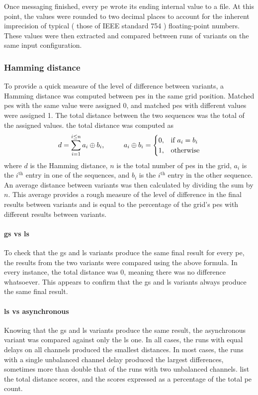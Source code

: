 Once messaging finished, every \gls{pe} wrote its ending internal value to a file.  At this point, the values were rounded to two decimal places to account for the inherent imprecision of typical (\eg{} those of IEEE standard 754 \cite{ieee754,Goldberg1991}) floating-point numbers.  These values were then extracted and compared between runs of variants on the same input configuration.

\subsubsection{Hamming distance}
To provide a quick measure of the level of difference between variants, a Hamming distance was computed between \glspl{pe} in the same grid position.  Matched \glspl{pe} with the same value were assigned 0, and matched \glspl{pe} with different values were assigned 1.  The total distance between the two sequences was the total of the assigned values.  \Ie{} the total distance was computed as \[d = \sum_{i = 1}^{i \leq n} a_i \oplus b_i\text{,}
\hspace{1.0cm}%
a_i \oplus b_i = \begin{cases}
    0, & \text{if } a_i = b_i \\
    1, & \text{otherwise}
\end{cases}
\] where \(d\) is the Hamming distance, \(n\) is the total number of \glspl{pe} in the grid, \(a_i\) is the \(i^{\text{th}}\) entry in one of the sequences, and \(b_i\) is the \(i^{\text{th}}\) entry in the other sequence.  An average distance between variants was then calculated by dividing the sum by \(n\).  This average provides a rough measure of the level of difference in the final results between variants and is equal to the percentage of the grid's \glspl{pe} with different results between variants.

\paragraph{\Gls{gs} vs \gls{ls}}
To check that the \gls{gs} and \gls{ls} variants produce the same final result for every \gls{pe}, the results from the two variants were compared using the above formula.  In every instance, the total distance was 0, meaning there was no difference whatsoever.  This appears to confirm that the \gls{gs} and \gls{ls} variants always produce the same final result.

\paragraph{\Gls{ls} vs asynchronous}
Knowing that the \gls{gs} and \gls{ls} variants produce the same result, the asynchronous variant was compared against only the \gls{ls} one.  In all cases, the runs with equal delays on all channels produced the smallest distances.  In most cases, the runs with a single unbalanced channel delay produced the largest differences, sometimes more than double that of the runs with two unbalanced channels.   list the total distance scores, and the scores expressed as a percentage of the total \gls{pe} count.

